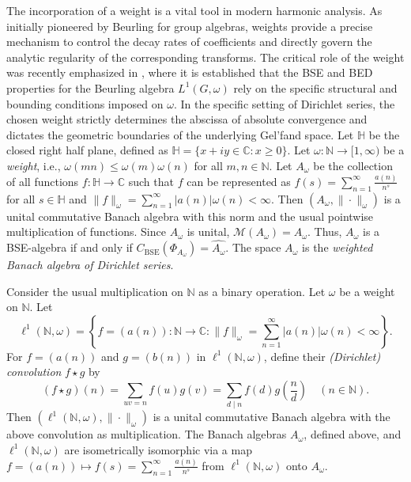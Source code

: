 \documentclass{amsart}
\theoremstyle{definition}
\theoremstyle{remark}
\numberwithin{equation}{section}
\begin{document}
The incorporation of a weight is a vital tool in modern harmonic analysis. As initially pioneered by Beurling \cite{beurling1938} for group algebras, weights provide a precise mechanism to control the decay rates of coefficients and directly govern the analytic regularity of the corresponding transforms. The critical role of the weight was recently emphasized in \cite{dabhi_beurling}, where it is established that the BSE and BED properties for the Beurling algebra $L^1(G,\omega)$ rely on the specific structural and bounding conditions imposed on $\omega$. In the specific setting of Dirichlet series, the chosen weight strictly determines the abscissa of absolute convergence and dictates the geometric boundaries of the underlying Gel'fand space. Let $\mathbb H$ be the closed right half plane, defined as $\mathbb H=\{x+iy \in \mathbb C:x\geq 0\}$. Let $\omega:\mathbb N \to [1,\infty)$ be a \emph{weight}, i.e., $\omega(mn)\leq \omega(m)\omega(n)$ for all $m,n \in \mathbb N$. Let $A_\omega$ be the collection of all functions $f:\mathbb H \to \mathbb C$ such that $f$ can be represented as $f(s)=\sum_{n=1}^\infty \frac{a(n)}{n^s}$ for all $s \in \mathbb H$ and $\|f\|_\omega=\sum_{n=1}^\infty |a(n)|\omega(n)<\infty$. Then $(A_\omega,\|\cdot\|_\omega)$ is a unital commutative Banach algebra with this norm and the usual pointwise multiplication of functions. Since $A_\omega$ is unital, $\mathcal M(A_\omega)=A_\omega$. Thus, $A_\omega$ is a BSE-algebra if and only if $C_{\operatorname{BSE}}(\Phi_{A_\omega})=\widehat{A_\omega}$. The space $A_\omega$ is the \emph{weighted Banach algebra of Dirichlet series}.

Consider the usual multiplication on $\mathbb N$ as a binary operation. Let $\omega$ be a weight on $\mathbb N$. Let $$\ell^1(\mathbb N,\omega)=\left\{f=(a(n)):\mathbb N \to \mathbb C:\|f\|_\omega=\sum_{n=1}^\infty|a(n)|\omega(n)<\infty\right\}.$$For $f=(a(n))$ and $g=(b(n))$ in $\ell^1(\mathbb N,\omega)$, define their \emph{(Dirichlet) convolution} $f\star g$ by
\begin{equation}\label{convolution}
(f\star g)(n)=\sum_{uv=n}f(u)g(v)=\sum_{d\mid n}f(d)g\left(\frac{n}{d}\right)\quad(n\in \mathbb N).
\end{equation}
Then $(\ell^1(\mathbb N,\omega),\|\cdot\|_\omega)$ is a unital commutative Banach algebra with the above convolution as multiplication. The Banach algebras $A_\omega$, defined above, and $\ell^1(\mathbb N,\omega)$ are isometrically isomorphic via a map $f=(a(n))\mapsto f(s)=\sum_{n=1}^\infty \frac{a(n)}{n^s}$ from $\ell^1(\mathbb N,\omega)$ onto $A_\omega$.
\end{document}
